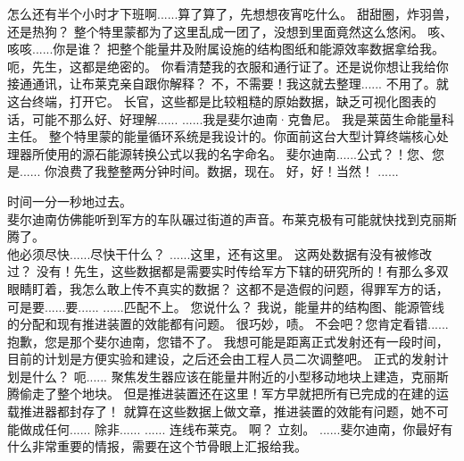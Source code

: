 \documentclass[openany]{book}
\begin{document}
\begin{dialogue}
     怎么还有半个小时才下班啊......算了算了，先想想夜宵吃什么。
     甜甜圈，炸羽兽，还是热狗？
     整个特里蒙都为了这里乱成一团了，没想到里面竟然这么悠闲。
     咳、咳咳......你是谁？
     把整个能量井及附属设施的结构图纸和能源效率数据拿给我。
     呃，先生，这都是绝密的。
     你看清楚我的衣服和通行证了。还是说你想让我给你接通通讯，让布莱克亲自跟你解释？
     不，不需要！我这就去整理......
     不用了。就这台终端，打开它。
     长官，这些都是比较粗糙的原始数据，缺乏可视化图表的话，可能不那么好、好理解......
     ......我是斐尔迪南·克鲁尼。
     我是莱茵生命能量科主任。
     整个特里蒙的能量循环系统是我设计的。你面前这台大型计算终端核心处理器所使用的源石能源转换公式以我的名字命名。
     斐尔迪南......公式？！您、您是......
     你浪费了我整整两分钟时间。数据，现在。
     好，好！当然！
     ......\par
    时间一分一秒地过去。\\
    斐尔迪南仿佛能听到军方的车队碾过街道的声音。布莱克极有可能就快找到克丽斯腾了。\\
    他必须尽快......尽快干什么？
     ......这里，还有这里。
     这两处数据有没有被修改过？
     没有！先生，这些数据都是需要实时传给军方下辖的研究所的！有那么多双眼睛盯着，我怎么敢上传不真实的数据？
     这都不是造假的问题，得罪军方的话，可是要......要......
     ......匹配不上。
     您说什么？
     我说，能量井的结构图、能源管线的分配和现有推进装置的效能都有问题。
     很巧妙，啧。
     不会吧？您肯定看错......抱歉，您是那个斐尔迪南，您错不了。
     我想可能是距离正式发射还有一段时间，目前的计划是方便实验和建设，之后还会由工程人员二次调整吧。
     正式的发射计划是什么？
     呃......
     聚焦发生器应该在能量井附近的小型移动地块上建造，克丽斯腾偷走了整个地块。
     但是推进装置还在这里！军方早就把所有已完成的在建的运载推进器都封存了！
     就算在这些数据上做文章，推进装置的效能有问题，她不可能做成任何......
     除非......
     ......
     连线布莱克。
     啊？
     立刻。
     ......斐尔迪南，你最好有什么非常重要的情报，需要在这个节骨眼上汇报给我。

\end{dialogue}
\end{document}
